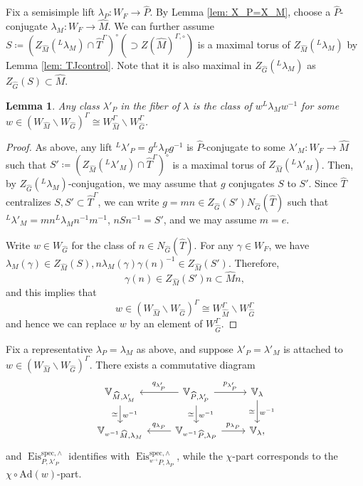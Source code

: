 \documentclass{amsart}
\newtheorem{lemma}[theorem]{Lemma}
\theoremstyle{definition}
\theoremstyle{remark}
\numberwithin{equation}{section}
\newcommand{\spec}{\mathrm{spec}}
\newcommand{\wh}{\widehat}
\DeclareMathOperator{\Eis}{\mathrm{Eis}}
\newcommand{\V}{\mathbb{V}}
\begin{document}
Fix a semisimple lift $\lambda_P\colon W_F\to \wh P$. By Lemma \ref{lem: X_P=X_M}, choose a $\wh P$-conjugate $\lambda_M\colon W_F\to \wh M$. We can further assume $S\coloneq (Z_{\wh M}({}^L \lambda_M)\cap \wh T^{\Gamma})^\circ (\supset Z(\wh M)^{\Gamma,\circ})$ is a maximal torus of $Z_{\wh M}({}^L \lambda_M)$ by Lemma \ref{lem: TJcontrol}. Note that it is also maximal in $Z_{\wh G}({}^L \lambda_M)$ as $Z_{\wh G}(S)\subset \wh M$. 

\begin{lemma}\label{lem: ParPParGFibers}
Any class $\lambda'_P $ in the fiber of $\lambda$ is the class of $w{}^L\lambda_M w^{-1}$ for some $w \in (W_{\wh M}\backslash W_{\wh G})^\Gamma\cong W_{\wh M}^\Gamma \backslash W_{\wh G}^\Gamma$. 
\end{lemma}

\begin{proof}
As above, any lift ${}^L \lambda'_P=g{}^L \lambda_P g^{-1}$ is $\wh P$-conjugate to some $\lambda'_M\colon W_F \to \wh M$ such that $S'\coloneq (Z_{\wh M}({}^L \lambda'_M)\cap \wh T^\Gamma)^\circ$ is a maximal torus of $Z_{\wh M}({}^L \lambda'_M)$. Then, by $Z_{\wh G}({}^L \lambda_M)$-conjugation, we may assume that $g$ conjugates $S$ to $S'$. Since $\wh T$ centralizes $S, S'\subset \wh T^\Gamma$, we can write $g=mn\in Z_{\wh G}(S')N_{\wh G}(\wh T)$ such that ${}^L \lambda'_M=mn{}^L \lambda_M n^{-1}m^{-1}$, $nSn^{-1}=S'$, and we may assume $m=e$. 

Write $w\in W_{\wh G}$ for the class of $n\in N_{\wh G}(\wh T)$. For any $\gamma \in W_F$, we have $\lambda_M (\gamma ) \in Z_{\wh M}(S), n\lambda_{M}(\gamma) \gamma(n)^{-1}\in Z_{\wh M}(S')$. Therefore, 
\[
\gamma (n)\in Z_{\wh M}(S') n \subset \wh M n,
\]
and this implies that 
\[
w \in (W_{\wh M}\backslash W_{\wh G})^\Gamma\cong W_{\wh M}^\Gamma \backslash W_{\wh G}^\Gamma
\]
and hence we can replace $w$ by an element of $W_{\wh G}^\Gamma$. 
\end{proof}

Fix a representative $\lambda_P=\lambda_M$ as above, and suppose $\lambda'_P=\lambda'_M$ is attached to $w\in (W_{\wh M}\backslash W_{\wh G})^\Gamma$. There exists a commutative diagram
\[
\begin{tikzcd}
    \V_{\wh M,\lambda'_M} \arrow[d, "w^{-1}", "\simeq"'] 
    & \V_{\wh P, \lambda'_P} \arrow[l, "q_{\lambda'_P}"'] \arrow[r, "p_{\lambda'_P}"] \arrow[d, "w^{-1}", "\simeq"'] 
    & \V_\lambda \arrow[d, "w^{-1}", "\simeq"'] \\
    \V_{{}^{w^{-1}}\wh M,\lambda_M} 
    & \V_{{}^{w^{-1}}\wh P,\lambda_P} \arrow[l, "q_{\lambda_P}"'] \arrow[r, "p_{\lambda_P}"]
    & \V_\lambda, 
\end{tikzcd}
\]
and $\Eis^{\spec, \wedge}_{P, \lambda'_P}$ identifies with $\Eis^{\spec, \wedge}_{{}^{w^{-1}} P, \lambda_P}$, while the $\chi$-part corresponds to the $\chi \circ \mathrm{Ad}(w)$-part. 
\end{document}
